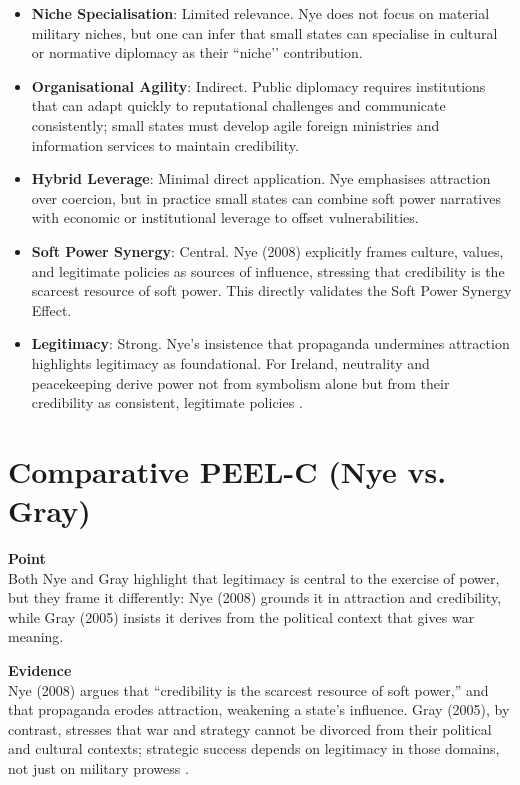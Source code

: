 \begin{itemize}
	\item \textbf{Niche Specialisation}: Limited relevance. Nye does not focus on material military niches, but one can infer that small states can specialise in cultural or normative diplomacy as their ``niche’’ contribution. 
	\item \textbf{Organisational Agility}: Indirect. Public diplomacy requires institutions that can adapt quickly to reputational challenges and communicate consistently; small states must develop agile foreign ministries and information services to maintain credibility. 
	\item \textbf{Hybrid Leverage}: Minimal direct application. Nye emphasises attraction over coercion, but in practice small states can combine soft power narratives with economic or institutional leverage to offset vulnerabilities. 
	\item \textbf{Soft Power Synergy}: Central. Nye (2008) explicitly frames culture, values, and legitimate policies as sources of influence, stressing that credibility is the scarcest resource of soft power. This directly validates the Soft Power Synergy Effect. 
	\item \textbf{Legitimacy}: Strong. Nye’s insistence that propaganda undermines attraction highlights legitimacy as foundational. For Ireland, neutrality and peacekeeping derive power not from symbolism alone but from their credibility as consistent, legitimate policies \parencite{NYE_2008}.
\end{itemize}

\section*{Comparative PEEL-C (Nye vs. Gray)}

\textbf{Point} \\  
Both Nye and Gray highlight that legitimacy is central to the exercise of power, but they frame it differently: Nye (2008) grounds it in attraction and credibility, while Gray (2005) insists it derives from the political context that gives war meaning.  

\textbf{Evidence} \\  
Nye (2008) argues that ``credibility is the scarcest resource of soft power,'' and that propaganda erodes attraction, weakening a state’s influence. Gray (2005), by contrast, stresses that war and strategy cannot be divorced from their political and cultural contexts; strategic success depends on legitimacy in those domains, not just on military prowess \parencite{NYE_2008,GRAY_2005}.  


